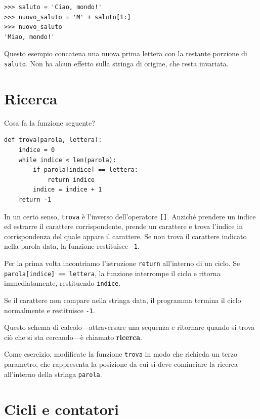 \documentclass[10pt]{book}
\begin{document}
\begin{verbatim}
>>> saluto = 'Ciao, mondo!'
>>> nuovo_saluto = 'M' + saluto[1:]
>>> nuovo_saluto
'Miao, mondo!'
\end{verbatim}
%
Questo esempio concatena una nuova prima lettera con la restante porzione di {\tt saluto}. Non ha alcun effetto sulla stringa di origine, che resta invariata.


\section{Ricerca}
\label{find}

Cosa fa la funzione seguente?

\begin{verbatim}
def trova(parola, lettera):
    indice = 0
    while indice < len(parola):
        if parola[indice] == lettera:
            return indice
        indice = indice + 1
    return -1
\end{verbatim}
%
In un certo senso, {\tt trova} è l'inverso dell'operatore {\tt []}.
Anziché prendere un indice ed estrarre il carattere corrispondente, prende un carattere e trova l'indice in corrispondenza del quale appare il carattere. Se non trova il carattere indicato nella parola data, la funzione restituisce {\tt -1}.

Per la prima volta incontriamo l'istruzione {\tt return} all'interno di un ciclo. Se {\tt parola[indice] == lettera}, la funzione interrompe il ciclo e ritorna immediatamente, restituendo {\tt indice}. 

Se il carattere non compare nella stringa data, il programma termina il ciclo  normalmente e restituisce {\tt -1}.

Questo schema di calcolo---attraversare una sequenza e ritornare quando si trova ciò che si sta cercando---è chiamato {\bf ricerca}.

Come esercizio, modificate la funzione {\tt trova} in modo che richieda un terzo parametro, che rappresenta la posizione da cui si deve cominciare la ricerca all'interno della stringa {\tt parola}.


\section{Cicli e contatori}
\label{counter}
\end{document}
